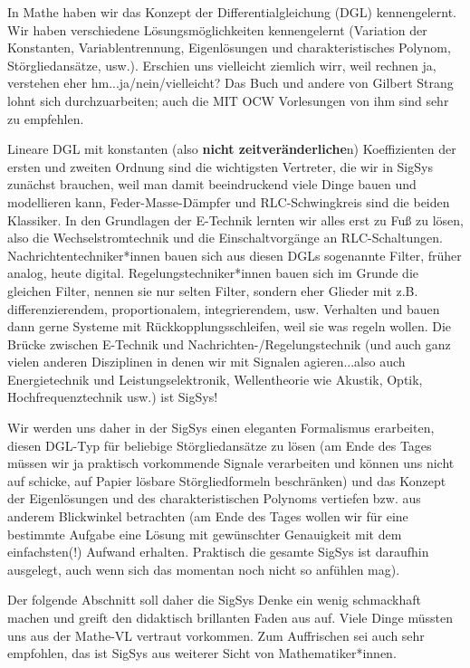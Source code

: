 In Mathe haben wir das Konzept der Differentialgleichung (DGL) kennengelernt.
%
Wir haben verschiedene Lösungsmöglichkeiten kennengelernt (Variation
der Konstanten, Variablentrennung, Eigenlösungen und charakteristisches Polynom,
Störgliedansätze, usw.). Erschien uns vielleicht ziemlich wirr, weil rechnen
ja, verstehen eher hm...ja/nein/vielleicht?
Das Buch \cite{Strang2014} und andere von Gilbert Strang
lohnt sich durchzuarbeiten; auch die MIT OCW Vorlesungen von ihm sind sehr zu empfehlen.


Lineare DGL mit konstanten (also \textbf{nicht zeitveränderliche}n) Koeffizienten der
ersten und zweiten Ordnung sind die wichtigsten Vertreter, die wir in SigSys
zunächst brauchen, weil man damit beeindruckend viele Dinge bauen und modellieren
kann, Feder-Masse-Dämpfer und RLC-Schwingkreis sind die beiden Klassiker.
%
In den Grundlagen der E-Technik lernten wir alles erst zu Fuß zu lösen, also
die Wechselstromtechnik und die Einschaltvorgänge an RLC-Schaltungen.
%
Nachrichtentechniker*innen bauen sich aus diesen DGLs sogenannte Filter,
früher analog, heute digital.
%
Regelungstechniker*innen bauen sich im Grunde die gleichen Filter, nennen sie nur
selten Filter, sondern eher Glieder mit z.B. differenzierendem, proportionalem,
integrierendem, usw. Verhalten und bauen dann gerne Systeme mit
Rückkopplungsschleifen, weil sie was regeln wollen.
%
Die Brücke zwischen E-Technik und Nachrichten-/Regelungstechnik (und auch
ganz vielen anderen Disziplinen in denen wir mit Signalen agieren...also
auch Energietechnik und Leistungselektronik, Wellentheorie wie
Akustik, Optik, Hochfrequenztechnik usw.) ist SigSys!

Wir werden uns daher in der SigSys einen eleganten Formalismus erarbeiten,
diesen DGL-Typ für beliebige Störgliedansätze zu lösen (am Ende des Tages
müssen wir ja praktisch vorkommende Signale verarbeiten und können uns nicht
auf schicke, auf Papier lösbare Störgliedformeln beschränken)
und das Konzept der Eigenlösungen und des charakteristischen
Polynoms vertiefen bzw. aus anderem Blickwinkel betrachten (am Ende des Tages
wollen wir für eine bestimmte Aufgabe eine Lösung mit gewünschter Genauigkeit
mit dem einfachsten(!) Aufwand erhalten. Praktisch die gesamte SigSys ist daraufhin
ausgelegt, auch wenn sich das momentan noch nicht so anfühlen mag).

Der folgende Abschnitt soll daher die SigSys Denke ein wenig schmackhaft machen und
greift den didaktisch brillanten Faden aus \cite{Strang2014} auf. Viele Dinge
müssten uns aus der Mathe-VL vertraut vorkommen.
%
Zum Auffrischen sei auch \cite{Burg2013} sehr empfohlen, das ist SigSys aus weiterer
Sicht von Mathematiker*innen.
%
